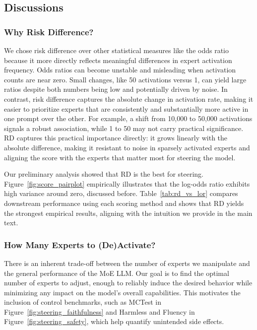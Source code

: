 \documentclass{article} %
\begin{document}
\subsection{Discussions}

\subsubsection{Why Risk Difference?}
\label{sec:why_risk_difference}
We chose risk difference over other statistical measures like the odds ratio because it more directly reflects meaningful differences in expert activation frequency. Odds ratios can become unstable and misleading when activation counts are near zero. Small changes, like 50 activations versus 1, can yield large ratios despite both numbers being low and potentially driven by noise. In contrast, risk difference captures the absolute change in activation rate, making it easier to prioritize experts that are consistently and substantially more active in one prompt over the other. For example, a shift from 10,000 to 50,000 activations signals a robust association, while 1 to 50 may not carry practical significance. 
RD captures this practical importance directly: it grows linearly with the absolute difference, making it resistant to noise in sparsely activated experts and aligning the score with the experts that matter most for steering the model.



Our preliminary analysis showed that RD is the best for steering. Figure~\ref{fig:score_pairplot} empirically illustrates that the log-odds ratio exhibits high variance around zero, discussed before. 
Table~\ref{tab:rd_vs_lor} compares downstream performance using each scoring method and shows that RD yields the strongest empirical results, aligning with the intuition we provide in the main text.



\subsubsection{How Many Experts to (De)Activate?}
There is an inherent trade-off between the number of experts we manipulate and the general performance of the MoE LLM. Our goal is to find the optimal number of experts to adjust, enough to reliably induce the desired behavior while minimizing any impact on the model’s overall capabilities. This motivates the inclusion of control benchmarks, such as MCTest in Figure~\ref{fig:steering_faithfulness} and Harmless and Fluency in Figure~\ref{fig:steering_safety}, which help quantify unintended side effects.
\end{document}
